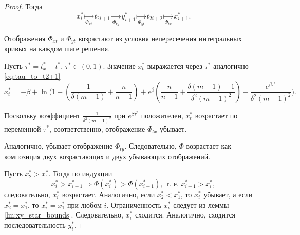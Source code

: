 \begin{proof}
	Тогда
	\begin{equation}
		x^*_i \underset{\Phi_{xt}}{\longmapsto} t_{2i + 1} \underset{\Phi_{ty}}{\longmapsto} y^*_{i + 1}  \underset{\Phi_{yt}}{\longmapsto}  t_{2i + 2} \underset{\Phi_{tx}}{\longmapsto}  x^*_{i + 1}.
	\end{equation}
	
	
	Отображения $\Phi_{xt}$ и $\Phi_{yt}$ возрастают из условия непересечения интегральных кривых на каждом шаге решения.
	
	Пусть $\tau^* = t_x^* - t^*$, $\tau^* \in (0, 1)$. Значение $x^*_t$ выражается через $\tau^*$ аналогично \eqref{eq:tau_to_t2+1}
	\footnotesize
	\[
	x^*_t = -\beta + \ln\Bigg( 1 - \left(\frac{1}{\delta(m - 1)} + \frac{n}{n - 1}\right) +  e^{\beta} \left(\frac{n}{n - 1} + \frac{\delta(m - 1) - 1}{\delta^2 (m - 1)^2}\right) +  \frac{e^{\beta \tau^*}}{\delta^2 (m - 1)^2} \Bigg).
	\]
	\normalsize
	
	
	Поскольку коэффициент $\frac{1}{\delta^2 (m - 1)^2}$ при $e^{\beta \tau^*}$ положителен, $x^*_t$ возрастает по переменной $\tau^*$, соответственно, отображение $\Phi_{tx}$ убывает.
	
	
	Аналогично, убывает отображение $\Phi_{ty}$. Следовательно, $\Phi$ возрастает как композиция двух возрастающих и двух убывающих отображений.
	
	Пусть $x^*_2 > x^*_1$. Тогда по индукции
	\[
	x^*_{i} > x^*_{i - 1} \Rightarrow \Phi(x^*_i) > \Phi(x^*_{i - 1}), \text{ т.~е. } x^*_{i + 1} > x^*_{i},
	\]
	следовательно, $x^*_i$ возрастает. Аналогично, если $x^*_2 < x^*_1$, то $x^*_i$ убывает, а если $x^*_2 = x^*_1$, то $x^*_i = x^*_1$ при любом $i$. Ограниченность $x^*_i$ следует из леммы \ref{lm:xy_star_bounds}. Следовательно, $x^*_i$ сходится. Аналогично, сходится последовательность $y^*_i$.
\end{proof}

